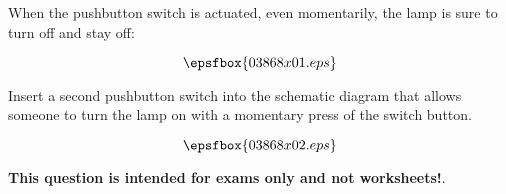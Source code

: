

When the pushbutton switch is actuated, even momentarily, the lamp is sure to turn off and stay off:

$$\epsfbox{03868x01.eps}$$

Insert a second pushbutton switch into the schematic diagram that allows someone to turn the lamp on with a momentary press of the switch button.







$$\epsfbox{03868x02.eps}$$







{\bf This question is intended for exams only and not worksheets!}.




